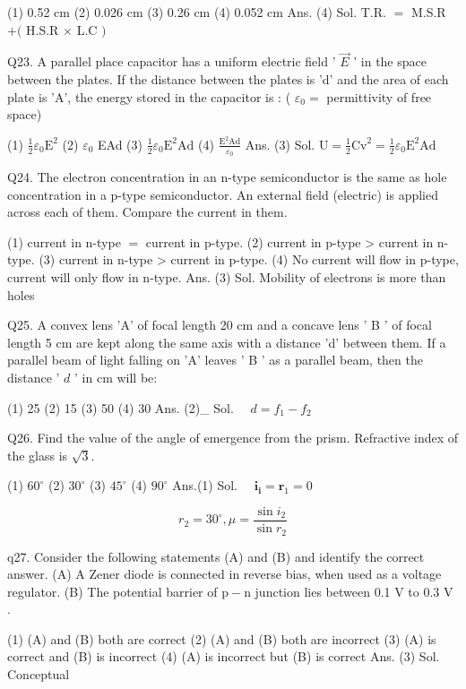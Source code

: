 \begin{enumerate}
(1) 0.52 cm
(2) 0.026 cm
(3) 0.26 cm
(4) 0.052 cm
Ans. (4)
Sol. T.R. $=$ M.S.R $+($ H.S.R $\times$ L.C $)$

Q23. A parallel place capacitor has a uniform electric field ' $\vec{E}$ ' in the space between the plates. If the distance between the plates is 'd' and the area of each plate is 'A', the energy stored in the capacitor is : ( $\varepsilon_{0}=$ permittivity of free space)

(1) $\frac{1}{2} \varepsilon_{0} \mathrm{E}^{2}$
(2) $\varepsilon_{0}$ EAd
(3) $\frac{1}{2} \varepsilon_{0} \mathrm{E}^{2} \mathrm{Ad}$
(4) $\frac{\mathrm{E}^{2} \mathrm{Ad}}{\varepsilon_{0}}$
Ans. (3)
Sol. $\mathrm{U}=\frac{1}{2} \mathrm{Cv}^{2}=\frac{1}{2} \varepsilon_{0} \mathrm{E}^{2} \mathrm{Ad}$

Q24. The electron concentration in an n-type semiconductor is the same as hole concentration in a p-type semiconductor. An external field (electric) is applied across each of them. Compare the current in them.

(1) current in n-type $=$ current in p-type.
(2) current in p-type > current in n-type.
(3) current in n-type > current in p-type.
(4) No current will flow in p-type, current will only flow in n-type.
Ans. (3)
Sol. Mobility of electrons is more than holes

Q25. A convex lens 'A' of focal length 20 cm and a concave lens ' B ' of focal length 5 cm are kept along the same axis with a distance 'd' between them. If a parallel beam of light falling on 'A' leaves ' B ' as a parallel beam, then the distance ' $d$ ' in cm will be:

(1) 25
(2) 15
(3) 50
(4) 30
Ans. (2)_
Sol. $\quad d=f_{1}-f_{2}$

Q26. Find the value of the angle of emergence from the prism. Refractive index of the glass is $\sqrt{3}$.

(1) $60^{\circ}$
(2) $30^{\circ}$
(3) $45^{\circ}$
(4) $90^{\circ}$
Ans.(1)
Sol. $\quad \mathbf{i}_{\mathbf{i}}=\mathbf{r}_{1}=0$

$$
r_{2}=30^{\circ}, \mu=\frac{\sin i_{2}}{\sin r_{2}}
$$

q27.  Consider the following statements (A) and (B) and identify the correct answer.
(A) A Zener diode is connected in reverse bias, when used as a voltage regulator.
(B) The potential barrier of $\mathrm{p}-\mathrm{n}$ junction lies between 0.1 V to 0.3 V .

(1) (A) and (B) both are correct
(2) (A) and (B) both are incorrect
(3) (A) is correct and (B) is incorrect
(4) (A) is incorrect but (B) is correct
Ans. (3)
Sol. Conceptual


\end{enumerate}
